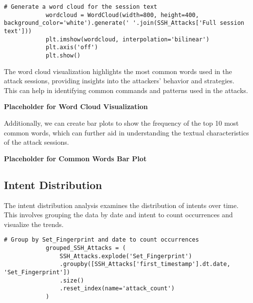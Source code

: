         \begin{lstlisting}[caption={Generate a word cloud from session text}, label={lst:generate-wordcloud}]
            # Generate a word cloud for the session text
            wordcloud = WordCloud(width=800, height=400, background_color='white').generate(' '.join(SSH_Attacks['Full session text']))
            plt.imshow(wordcloud, interpolation='bilinear')
            plt.axis('off')
            plt.show()
        \end{lstlisting}
        
        \vspace{1em}

        The word cloud visualization highlights the most common words used in the attack sessions, providing insights into the attackers' behavior and strategies. This can help in identifying common commands and patterns used in the attacks.

        \textbf{Placeholder for Word Cloud Visualization}

        Additionally, we can create bar plots to show the frequency of the top 10 most common words, which can further aid in understanding the textual characteristics of the attack sessions.

        \textbf{Placeholder for Common Words Bar Plot}

    \subsection{Intent Distribution}
            
        The intent distribution analysis examines the distribution of intents over time. This involves grouping the data by date and intent to count occurrences and visualize the trends.

        \begin{lstlisting}[caption={Group attacks by fingerprint and date}, label={lst:group-attacks}]
            # Group by Set_Fingerprint and date to count occurrences
            grouped_SSH_Attacks = (
                SSH_Attacks.explode('Set_Fingerprint')
                .groupby([SSH_Attacks['first_timestamp'].dt.date, 'Set_Fingerprint'])
                .size()
                .reset_index(name='attack_count')
            )
        \end{lstlisting}
        
        \vspace{1em}


